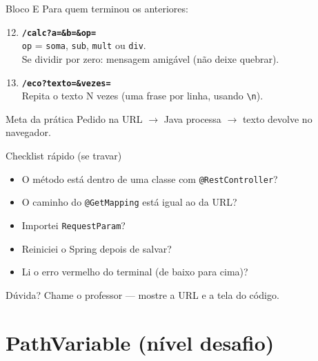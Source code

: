 \documentclass[aspectratio=169,11pt]{beamer}
\begin{document}
\begin{frame}{Bloco E}
  Para quem terminou os anteriores:

  \vspace{0.4em}
  \begin{enumerate}
    \setcounter{enumi}{11}
    \item \textbf{\texttt{/calc?a=\&b=\&op=}}\\
          \texttt{op} = \texttt{soma}, \texttt{sub}, \texttt{mult} ou \texttt{div}.\\
          Se dividir por zero: mensagem amigável (não deixe quebrar).
    \item \textbf{\texttt{/eco?texto=\&vezes=}}\\
          Repita o texto N vezes (uma frase por linha, usando \texttt{\textbackslash n}).
  \end{enumerate}

  \vspace{0.6em}
  \begin{block}{Meta da prática}
    Pedido na URL $\rightarrow$ Java processa $\rightarrow$ texto devolve no navegador.
  \end{block}
\end{frame}

\begin{frame}{Checklist rápido (se travar)}
  \begin{itemize}
    \item [ ] O método está dentro de uma classe com \texttt{@RestController}?
    \item [ ] O caminho do \texttt{@GetMapping} está igual ao da URL?
    \item [ ] Importei \texttt{RequestParam}?
    \item [ ] Reiniciei o Spring depois de salvar?
    \item [ ] Li o erro vermelho do terminal (de baixo para cima)?
  \end{itemize}

  \vspace{0.8em}
  Dúvida? Chame o professor --- mostre a URL e a tela do código.
\end{frame}

\section{PathVariable (nível desafio)}
\end{document}
